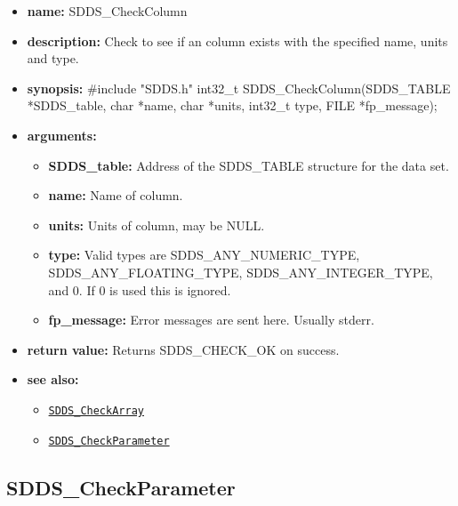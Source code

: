 \documentclass[11pt]{article}
\newcommand{\progref}[1]{\hyperref[SDDS_#1]{\tt SDDS\_#1}}
\begin{document}
\begin{itemize}
\item {\bf name:}\newline
SDDS\_CheckColumn
\item {\bf description:}\newline
Check to see if an column exists with the specified name, units and type.
\item {\bf synopsis:} \#include "SDDS.h"\newline
int32\_t SDDS\_CheckColumn(SDDS\_TABLE *SDDS\_table, char *name, char *units, int32\_t type, FILE *fp\_message);
\item {\bf arguments:}
\begin{itemize}
\item {\bf SDDS\_table:} Address of the SDDS\_TABLE structure for the data set.
\item {\bf name:} Name of column.
\item {\bf units:} Units of column, may be NULL.
\item {\bf type:} Valid types are SDDS\_ANY\_NUMERIC\_TYPE, SDDS\_ANY\_FLOATING\_TYPE, SDDS\_ANY\_INTEGER\_TYPE, and 0. If 0 is used this is ignored.
\item {\bf fp\_message:} Error messages are sent here. Usually stderr.
\end{itemize}
\item {\bf return value:}\newline
Returns SDDS\_CHECK\_OK on success.
\item {\bf see also:}
\begin{itemize}
\item \progref{CheckArray}
\item \progref{CheckParameter}
\end{itemize}
\end{itemize}

\subsection{SDDS\_CheckParameter}
\label{SDDS_CheckParameter}
\end{document}
